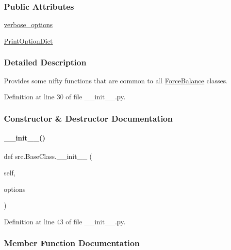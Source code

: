 \subsubsection*{Public Attributes}
\begin{DoxyCompactItemize}
\item 
\hyperlink{classsrc_1_1BaseClass_a967db6032b17a0d0090dfee599d62612}{verbose\+\_\+options}
\item 
\hyperlink{classsrc_1_1BaseClass_a1329cdd50381c56cead0b277647b3329}{Print\+Option\+Dict}
\end{DoxyCompactItemize}


\subsubsection{Detailed Description}
Provides some nifty functions that are common to all \hyperlink{namespaceForceBalance}{Force\+Balance} classes. 



Definition at line 30 of file \+\_\+\+\_\+init\+\_\+\+\_\+.\+py.



\subsubsection{Constructor \& Destructor Documentation}
\mbox{\label{classsrc_1_1BaseClass_af1f90c74098fe511fcef0d6e2a57e7c9}} 
\paragraph{\texorpdfstring{\+\_\+\+\_\+init\+\_\+\+\_\+()}{\_\_init\_\_()}}
{\footnotesize\ttfamily def src.\+Base\+Class.\+\_\+\+\_\+init\+\_\+\+\_\+ (\begin{DoxyParamCaption}\item[{}]{self,  }\item[{}]{options }\end{DoxyParamCaption})}



Definition at line 43 of file \+\_\+\+\_\+init\+\_\+\+\_\+.\+py.



\subsubsection{Member Function Documentation}
\mbox{\label{classsrc_1_1BaseClass_a1cf3951ee0ae6fdfe0e989be84e2e4ef}} 
